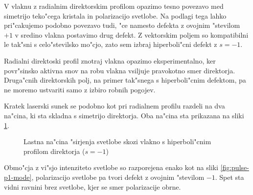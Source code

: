 \documentclass[12pt,twoside,openright,final]{report}
\begin{document}
V vlaknu z radialnim direktorskim profilom opazimo tesno povezavo med simetrijo teko"cega kristala in polarizacijo svetlobe. 
Na podlagi tega lahko pri"cakujemo podobno povezavo tudi, "ce namesto defekta z ovojnim "stevilom $+1$ v sredino vlakna postavimo drug defekt. 
Z vektorskim poljem so kompatibilni le tak"sni s celo"stevilsko mo"cjo, zato sem izbraj hiperboli"cni defekt z $s=-1$. 

Radialni direktoski profil znotraj vlakna opazimo eksperimentalno, ker povr"sinsko aktivna snov na robu vlakna vsiljuje pravokotno smer direktorja. 
Druga"cnih direktorskih polj, na primer tak"snega s hiperboli"cnim defektom, pa ne moremo ustvariti samo z izbiro robnih pogojev. 

Kratek laserski sunek se podobno kot pri radialnem profilu razdeli na dva na"cina, ki sta skladna s simetrijo direktorja. 
Oba na"cina sta prikazana na sliki \ref{fig:pulse-m1-mode}. 

\begin{figure}[!htbp]
 \centering
 \caption{Lastna na"cina "sirjenja svetlobe skozi vlakno s hiperboli"cnim profilom direktorja ($s=-1$)}
 \label{fig:pulse-m1-mode}
\end{figure}

Obmo"cja z vi"sjo intenziteto svetlobe so razporejena enako kot na sliki \ref{fig:pulse-p1-mode}, polarizacijo svetlobe pa tvori defekt z ovojnim "stevilom $-1$. 
Spet sta vidni ravnini brez svetlobe, kjer se smer polarizacije obrne. 
\end{document}
